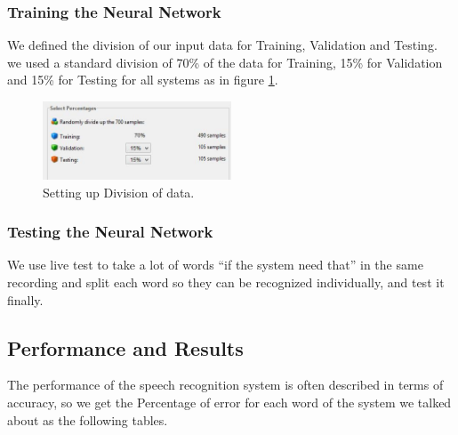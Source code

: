 \documentclass[12pt, a4paper, twoside]{report}
\begin{document}
\subsubsection{Training the Neural Network}
We defined the division of our input data for Training, Validation and Testing. we used a standard division of 70\% of the data for Training, 15\% for Validation and 15\% for Testing for all systems as in figure \ref{fig:nn-division}.
\begin{figure}[!h]
	\centering
	\includegraphics[width=0.5\textwidth]
	{images/chapter5/nn-division}
	\caption{Setting up Division of data.}
	\label{fig:nn-division}
\end{figure}

\subsubsection{Testing the Neural Network}
We use live test to take a lot of words ``if the system need that'' in the same recording and split each word so they can be recognized individually, and test it finally.
\subsection{Performance and Results}
The performance of the speech recognition system is often described in terms of accuracy, so we get the Percentage of error for each word of the system we talked about as the following tables.
\end{document}
